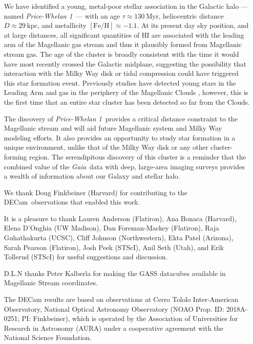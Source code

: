 \documentclass[twocolumn]{aastex62}
\newcommand{\gaia}{\textsl{Gaia}}
\newcommand{\decam}{DECam}
\newcommand{\feh}{\ensuremath{[\textrm{Fe} / \textrm{H}]}}
\newcommand{\hi}{H{\footnotesize I} }
\newcommand{\clustername}{\textsl{Price-Whelan 1}}
\newcommand{\clage}{\ensuremath{130~\textrm{Myr}}}
\newcommand{\clfeh}{\ensuremath{-1.1}}
\newcommand{\cldist}{\ensuremath{29~\textrm{kpc}}}
\begin{document}
We have identified a young, metal-poor stellar association in the Galactic halo --- named \clustername\ --- with an age $\tau \approx \clage$, heliocentric distance $D \approx \cldist$, and metallicity $\feh \approx \clfeh$.
At its present day sky position, and at large distances, all significant quantities of \hi are associated with the leading arm of the Magellanic gas stream and thus it plausibly formed from Magellanic stream gas.
The age of the cluster is broadly consistent with the time it would have most recently crossed the Galactic midplane, suggesting the possibility that interaction with the Milky Way disk or tidal compression could have triggered this star formation event.
Previously studies have detected young stars in the Leading Arm and gas in the periphery of the Magellanic Clouds \citep{Casetti-Dinescu:2014, Moni-Bidin:2017}, however, this is the first time that an entire star cluster has been detected so far from the Clouds.

The discovery of \clustername\ provides a critical distance constraint to the Magellanic stream and will aid future Magellanic system and Milky Way modeling efforts.
It also provides an opportunity to study star formation in a unique environment, unlike that of the Milky Way disk or any other cluster-forming region.
The serendipitous discovery of this cluster is a reminder that the combined value of the \gaia\ data with deep, large-area imaging surveys provides a wealth of information about our Galaxy and stellar halo.


\acknowledgments

We thank Doug Finkbeiner (Harvard) for contributing to the \decam\ observations that enabled this work.

It is a pleasure to thank
Lauren Anderson (Flatiron),
Ana Bonaca (Harvard),
Elena D'Onghia (UW Madison),
Dan Foreman-Mackey (Flatiron),
Raja Guhathakurta (UCSC),
Cliff Johnson (Northwestern),
Ekta Patel (Arizona),
Sarah Pearson (Flatiron),
Josh Peek (STScI),
Anil Seth (Utah),
and Erik Tollerud (STScI)
for useful suggestions and discussion.

D.L.N thanks Peter Kalberla for making the GASS datacubes available in Magellanic Stream coordinates.

The DECam results are based on observations at Cerro Tololo Inter-American Observatory, National Optical Astronomy Observatory (NOAO Prop. ID: 2018A-0251; PI: Finkbeiner), which is operated by the Association of Universities for Research in Astronomy (AURA) under a cooperative agreement with the National Science Foundation.
\end{document}
